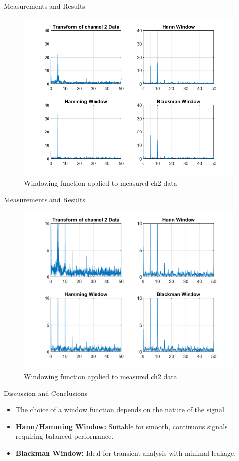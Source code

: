 \documentclass[10pt]{beamer}
\begin{document}
\begin{frame}{Measurements and Results}
  \begin{figure}
    \centering
    \includegraphics[width=0.6\linewidth]{figures/untitled.png}
    \caption{Windowing function applied to measured ch2 data}
    \label{fig:1}
\end{figure}
\end{frame}


\begin{frame}{Measurements and Results}
  \begin{figure}
    \centering
    \includegraphics[width=0.6\linewidth]{figures/a4_spectrum_hann.png}
    \caption{Windowing function applied to measured ch2 data}
    \label{fig:1}
\end{figure}
\end{frame}


\begin{frame}{Discussion and Conclusions}
  \begin{itemize}
    \item The choice of a window function depends on the nature of the signal.
    \item \textbf{Hann/Hamming Window:} Suitable for smooth, continuous signals requiring balanced performance.
    \item \textbf{Blackman Window:} Ideal for transient analysis with minimal leakage.
  \end{itemize}
\end{frame}
\end{document}
